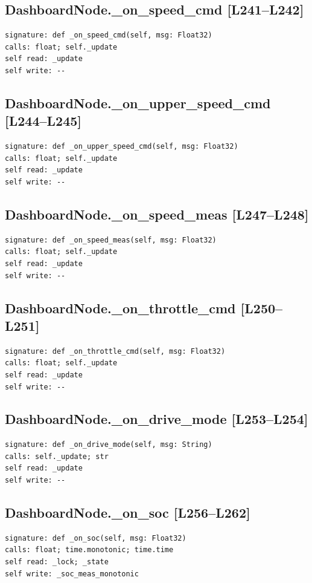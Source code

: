 \documentclass[a4paper,10pt,oneside]{book}
\begin{document}
\subsection*{DashboardNode.\_on\_speed\_cmd [L241--L242]}
\begin{lstlisting}[numbers=none]
signature: def _on_speed_cmd(self, msg: Float32)
calls: float; self._update
self read: _update
self write: --
\end{lstlisting}
\subsection*{DashboardNode.\_on\_upper\_speed\_cmd [L244--L245]}
\begin{lstlisting}[numbers=none]
signature: def _on_upper_speed_cmd(self, msg: Float32)
calls: float; self._update
self read: _update
self write: --
\end{lstlisting}
\subsection*{DashboardNode.\_on\_speed\_meas [L247--L248]}
\begin{lstlisting}[numbers=none]
signature: def _on_speed_meas(self, msg: Float32)
calls: float; self._update
self read: _update
self write: --
\end{lstlisting}
\subsection*{DashboardNode.\_on\_throttle\_cmd [L250--L251]}
\begin{lstlisting}[numbers=none]
signature: def _on_throttle_cmd(self, msg: Float32)
calls: float; self._update
self read: _update
self write: --
\end{lstlisting}
\subsection*{DashboardNode.\_on\_drive\_mode [L253--L254]}
\begin{lstlisting}[numbers=none]
signature: def _on_drive_mode(self, msg: String)
calls: self._update; str
self read: _update
self write: --
\end{lstlisting}
\subsection*{DashboardNode.\_on\_soc [L256--L262]}
\begin{lstlisting}[numbers=none]
signature: def _on_soc(self, msg: Float32)
calls: float; time.monotonic; time.time
self read: _lock; _state
self write: _soc_meas_monotonic
\end{lstlisting}
\end{document}
